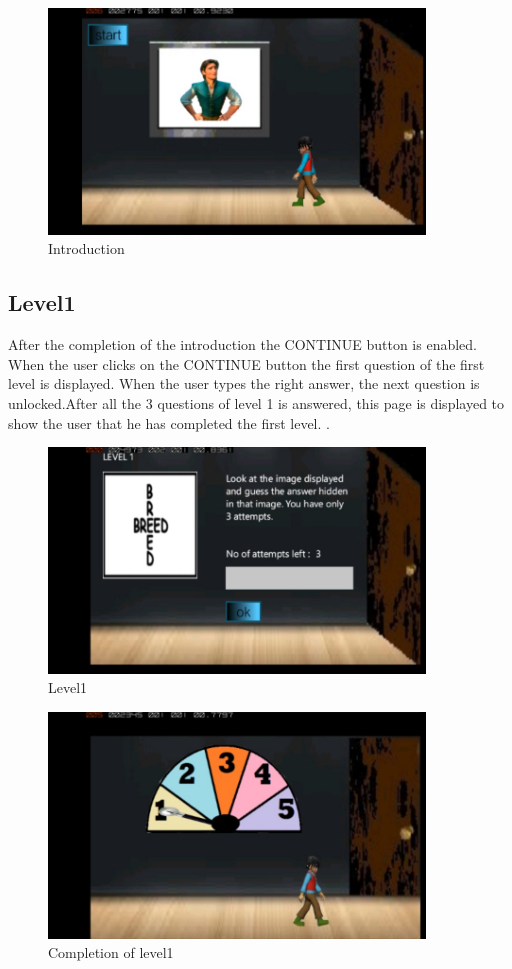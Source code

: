 \begin{figure}[htbp]
	\centering
	\includegraphics[width=10cm,height=6cm]{3.jpg}
	\caption{Introduction}
\end{figure}

\subsection{Level1}
\hspace{1cm}After the completion of the introduction the CONTINUE button is enabled.
When the user clicks on the CONTINUE button the first question of the first level
is displayed. When the user types the right answer, the next question is unlocked.After all the 3 questions of level 1 is answered, this page is displayed to show the user 
that he has completed the first level.
 \cite{DBLP:journals/ivc/KadyrovP03}.\\

\begin{figure}[htbp]
	\centering
	\includegraphics[width=10cm,height=6cm]{4.jpg}
	\caption{Level1}
\end{figure}

\begin{figure}[htbp]
	\centering
	\includegraphics[width=10cm,height=6cm]{5.jpg}
	\caption{Completion of level1}
\end{figure}


